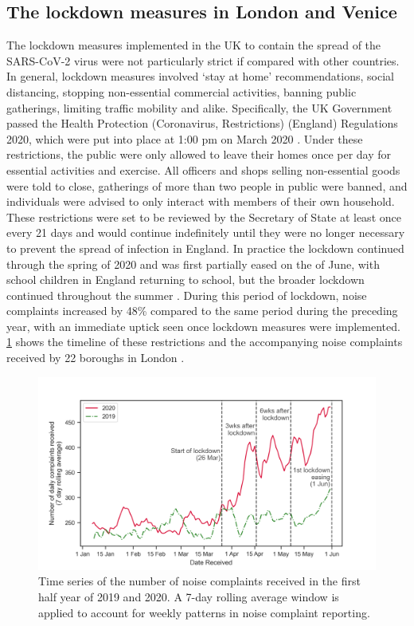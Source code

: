  \subsection{The lockdown measures in London and Venice}

 The lockdown measures implemented in the UK to contain the spread of the SARS-CoV-2 virus were not particularly strict if compared with other countries. In general, lockdown measures involved `stay at home' recommendations, social distancing, stopping non-essential commercial activities, banning public gatherings, limiting traffic mobility and alike. Specifically, the UK Government passed the Health Protection (Coronavirus, Restrictions) (England) Regulations 2020, which were put into place at 1:00 pm on  March 2020 \citep{PHE2020Health}. Under these restrictions, the public were only allowed to leave their homes once per day for essential activities and exercise. All officers and shops selling non-essential goods were told to close, gatherings of more than two people in public were banned, and individuals were advised to only interact with members of their own household. These restrictions were set to be reviewed by the Secretary of State at least once every 21 days and would continue indefinitely until they were no longer necessary to prevent the spread of infection in England. In practice the lockdown continued through the spring of 2020 and was first partially eased on the  of June, with school children in England returning to school, but the broader lockdown continued throughout the summer \citep{Tong2021Increases}. During this period of lockdown, noise complaints increased by 48\% compared to the same period during the preceding year, with an immediate uptick seen once lockdown measures were implemented. \cref{fig:noiseComplaints} shows the timeline of these restrictions and the accompanying noise complaints received by 22 boroughs in London \citep{Tong2021Increases}.

\begin{figure}[h]
  \centering
  \includegraphics[width=\textwidth]{Figures/LockdownNoiseComplaints-TimeSeriesPlot_3.png}
  \caption{Time series of the number of noise complaints received in the first half year of 2019 and 2020. A 7-day rolling average window is applied to account for weekly patterns in noise complaint reporting. \label{fig:noiseComplaints}}
\end{figure}

